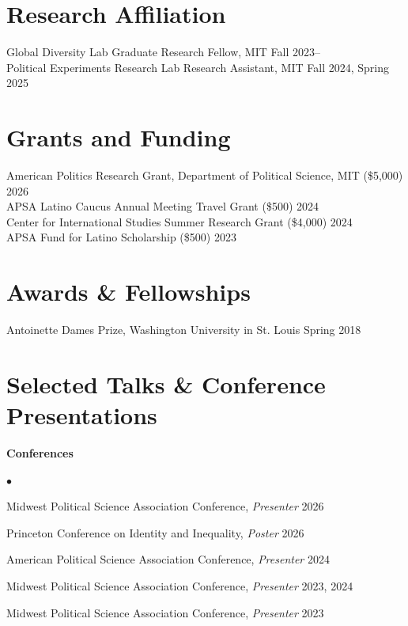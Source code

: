 \documentclass[margin,line]{res}
\newenvironment{list2}{
  \begin{list}{$\bullet$}{%
      \setlength{\itemsep}{0in}
      \setlength{\parsep}{0in} \setlength{\parskip}{0in}
      \setlength{\topsep}{0in} \setlength{\partopsep}{0in}
      \setlength{\leftmargin}{0.2in}}}{\end{list}}
\begin{document}
\begin{resume}
\section{\sc Research Affiliation}
Global Diversity Lab Graduate Research Fellow, MIT \hfill {Fall 2023--} \\
Political Experiments Research Lab Research Assistant, MIT \hfill {Fall 2024, Spring 2025}

\section{\sc Grants and Funding}
American Politics Research Grant, Department of Political Science, MIT (\$5,000) \hfill {2026} \\
APSA Latino Caucus Annual Meeting Travel Grant (\$500) \hfill {2024} \\
Center for International Studies Summer Research Grant (\$4,000) \hfill {2024} \\
APSA Fund for Latino Scholarship (\$500) \hfill {2023} 

\section{\sc Awards \& Fellowships}
Antoinette Dames Prize, Washington University in St. Louis \hfill {Spring 2018}

\section{\sc Selected Talks \& Conference Presentations}
\textbf{Conferences}
\vspace*{.05in}
\begin{list2}
  \item[] Midwest Political Science Association Conference, \textit{Presenter} \hfill {2026}
  \item[] Princeton Conference on Identity and Inequality, \textit{Poster} \hfill {2026}
  \item[] American Political Science Association Conference, \textit{Presenter} \hfill {2024}
  \item[] Midwest Political Science Association Conference, \textit{Presenter} \hfill {2023, 2024}
  \item[] Midwest Political Science Association Conference, \textit{Presenter} \hfill {2023}
\end{list2}


\end{resume}
\end{document}
